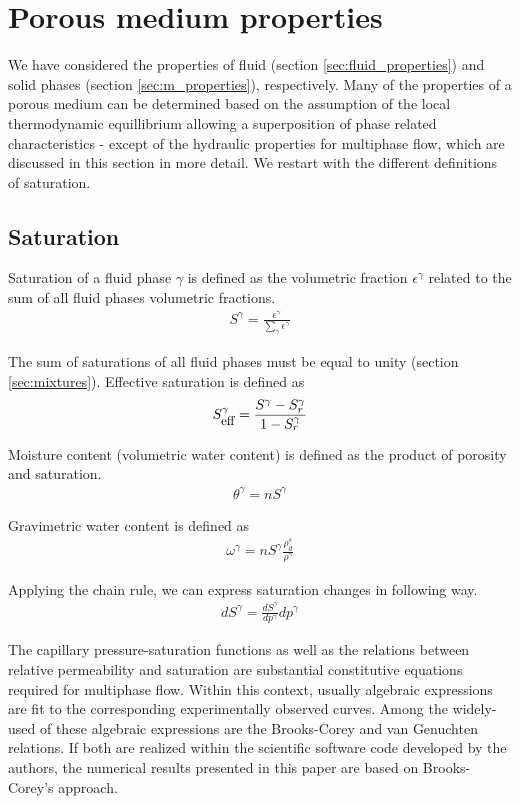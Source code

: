 \section{Porous medium properties}

We have considered the properties of fluid (section \ref{sec:fluid_properties}) and solid phases (section \ref{sec:m_properties}), respectively. Many of the properties of a porous medium can be determined based on the assumption of the local thermodynamic equillibrium allowing a superposition of phase related characteristics - except of the hydraulic properties for multiphase flow, which are discussed in this section in more detail. We restart with the different definitions of saturation.

\subsection{Saturation}

Saturation of a fluid phase $\gamma$ is defined as the volumetric fraction $\epsilon^\gamma$ related to the sum of all fluid phases volumetric fractions.
%
\begin{eqnarray}
S^\gamma =
\frac{\epsilon^\gamma}{\sum_{\gamma}\epsilon^\gamma}
\end{eqnarray}

The sum of saturations of all fluid phases must be equal to unity (section \ref{sec:mixtures}).
%
Effective saturation is defined as \cite{BroCor:64}
%
\begin{eqnarray}
S_{\mbox{\small eff}}^\gamma =
\frac{S^\gamma-S_r^\gamma}{1-S_r^\gamma}
\end{eqnarray}

Moisture content (volumetric water content) is defined as the
product of porosity and saturation.
\begin{eqnarray}
\theta^\gamma = n S^\gamma
\end{eqnarray}

Gravimetric water content is defined as
\begin{eqnarray}
\omega^\gamma
=
n S^\gamma
\frac{\rho_d^s}{\rho^\gamma}
\end{eqnarray}

Applying the chain rule, we can express saturation changes in
following way.
\begin{eqnarray}
dS^\gamma =
\frac{dS^\gamma}{dp^\gamma} dp^\gamma
\end{eqnarray}

The capillary pressure-saturation functions as well as the relations between relative permeability and saturation are substantial constitutive equations required for multiphase flow. Within this context, usually algebraic expressions are fit to the corresponding experimentally observed curves. Among the widely-used of these algebraic expressions are the Brooks-Corey \cite{BC:1964} and van Genuchten \cite{Van:80} relations. If both are realized within the scientific software code developed by the authors, the numerical results presented in this paper are based on Brooks-Corey's approach.

